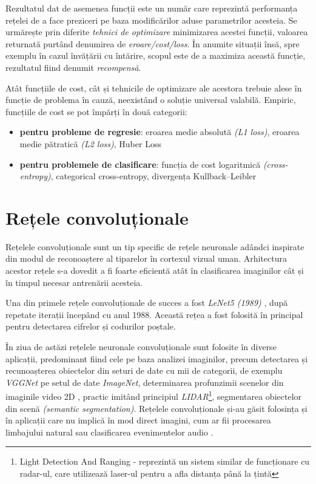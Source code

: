 Rezultatul dat de asemenea funcții este un număr care reprezintă performanța rețelei de a face preziceri pe baza modificărilor aduse parametrilor acesteia. Se urmărește prin diferite \textit{tehnici de optimizare} minimizarea acestei funcții, valoarea returnată purtând denumirea de \textit{eroare/cost/loss}. În anumite situații însă, spre exemplu în cazul învățării cu întărire, scopul este de a maximiza această funcție, rezultatul fiind denumit \textit{recompensă}.

Atât funcțiile de cost, cât și tehnicile de optimizare ale acestora trebuie alese în funcție de problema în cauză, neexistând o soluție universal valabilă. Empiric, funcțiile de cost se pot împărți în două categorii:
\begin{itemize}
\item \textbf{pentru probleme de regresie}: eroarea medie absolută \textit{(L1 loss)}, eroarea medie pătratică \textit{(L2 loss)},  Huber Loss
\item \textbf{pentru problemele de clasificare}: funcția de cost logaritmică \textit{(cross-entropy)}, categorical cross-entropy, divergența Kullback–Leibler
\end{itemize}

\section{Rețele convoluționale}
Rețelele convoluționale sunt un tip specific de rețele neuronale adândci inspirate din modul de reconoaștere al tiparelor în cortexul vizual uman. Arhitectura acestor rețele s-a dovedit a fi foarte eficientă atât în clasificarea imaginilor cât și în timpul necesar antrenării acesteia.

Una din primele rețele convoluționale de succes a fost \textit{LeNet5 (1989)} \cite{LeNet5}, după repetate iterații începând cu anul 1988. Această rețea a fost folosită în principal pentru detectarea cifrelor și codurilor poștale.

În ziua de astăzi rețelele neuronale convoluționale sunt folosite în diverse aplicații, predominant fiind cele pe baza analizei imaginilor, precum detectarea și recunoașterea obiectelor din seturi de date cu mii de categorii, de exemplu \textit{VGGNet} \cite{simonyan2014deep} pe setul de date \textit{ImageNet}, determinarea profunzimii scenelor din imaginile video 2D \cite{zhou2017unsupervised}, practic imitând principiul \textit{LIDAR}\footnote{Light Detection And Ranging - reprezintă un sistem similar de funcționare cu radar-ul, care utilizează laser-ul pentru a afla distanța până la țintă}, segmentarea obiectelor din scenă \textit{(semantic segmentation)}. Rețelele convoluționale și-au găsit folosința și în aplicații care nu implică în mod direct imagini, cum ar fii procesarea limbajului natural sau clasificarea evenimentelor audio \cite{cnnaudioclass}.

